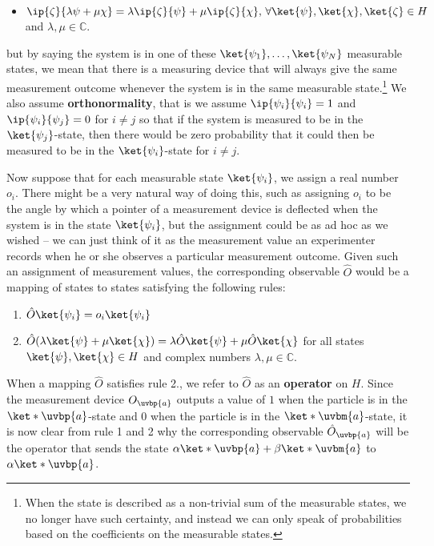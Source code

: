 {\begin{itemize}[topsep=0pt]
\item $\ip{\zeta}{\lambda\psi+\mu\chi}=\lambda\ip{\zeta}{\psi}+\mu\ip{\zeta}{\chi},\,\forall \ket{\psi},\ket{\chi},\ket{\zeta}\in H$ and  $\lambda,\mu\in\mathbb{C}$.
\end{itemize}} but by saying the system is in one of these $\ket{\psi_1},\ldots,\ket{\psi_N}$ measurable states, we mean that there is a measuring device that will always give the same measurement outcome whenever the system is in the same measurable state.\footnote{When the state is described as a non-trivial sum of the measurable states, we no longer have such certainty, and instead we can only speak of probabilities based on the coefficients on the measurable states.} We also assume \textbf{orthonormality}, that is we assume $\ip{\psi_i}{\psi_i}=1$ and $\ip{\psi_i}{\psi_j}=0$ for $i\neq j$ so that if the system is measured to be in the $\ket{\psi_j}$-state, then there would be zero probability that it could then be measured to be in the $\ket{\psi_i}$-state for $i\neq j$.  

Now suppose that for each measurable state $\ket{\psi_i}$, we assign a real number $o_i$.  There might be a very natural way of doing this, such as assigning  $o_i$ to be the angle by which a pointer of a measurement device is deflected when the system is in the state $\ket{\psi_i}$, but the assignment could be as ad hoc as we wished – we can just think of it as the measurement value an experimenter records when he or she observes a particular measurement outcome. Given such an assignment of measurement values, the corresponding observable $\hat{O}$ would be a mapping of states to states satisfying the following rules:
\begin{enumerate}[noitemsep, nosep, topsep=0pt]
\item $\hat{O}\ket{\psi_i}=o_i\ket{\psi_i}$
\item $\hat{O}(\lambda\ket{\psi}+\mu\ket{\chi})=\lambda\hat{O}\ket{\psi}+\mu\hat{O}\ket{\chi}$  for all states $\ket{\psi},\ket{\chi}\in H$ and complex numbers $\lambda,\mu\in\mathbb{C}$.
\end{enumerate}
When a mapping $\hat{O}$ satisfies rule 2., we refer to $\hat{O}$ as an \textbf{operator} on $H$. Since the measurement device $O_{\uvbp{a}}$ outputs a value of $1$ when the particle is in the $\ket*{\uvbp{a}}$-state and $0$ when the particle is in the $\ket*{\uvbm{a}}$-state, it is now clear from rule 1 and 2 why the corresponding observable $\hat{O}_{\uvbp{a}}$ will be the operator that sends the state $\alpha\ket*{\uvbp{a}}+\beta\ket*{\uvbm{a}}$ to $\alpha\ket*{\uvbp{a}}$.

